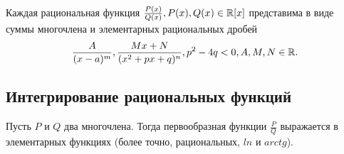 	\begin{corollary}
		Каждая рациональная функция $\frac{P(x)}{Q(x)}, P(x), Q(x) \in \mathbb R[x]$
		представима в виде суммы многочлена и элементарных рациональных дробей
		\[\frac{A}{(x - a)^m}, \frac{Mx + N}{(x^2 + px + q)^n}, p^2 - 4q < 0, A, M, N \in \mathbb R.\]
	\end{corollary}
	
	\subsection{Интегрирование рациональных функций}
	
	\begin{theorem}
		Пусть $P$ и $Q$ два многочлена. Тогда первообразная функции $\frac{P}{Q}$ выражается в элементарных функциях (более точно, рациональных, $ln$ и $arctg$).
	\end{theorem}
	
